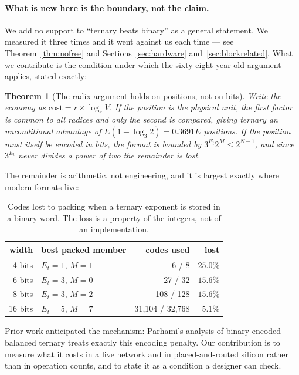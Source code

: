 \documentclass[11pt]{article}
\newtheorem{theorem}{Theorem}
\theoremstyle{definition}
\begin{document}
\paragraph{What is new here is the boundary, not the claim.} We add no support to
``ternary beats binary'' as a general statement. We measured it three times and it
went against us each time --- see Theorem~\ref{thm:nofree} and
Sections~\ref{sec:hardware} and~\ref{sec:blockrelated}. What we contribute is the
condition under which the sixty-eight-year-old argument applies, stated exactly:

\begin{theorem}[The radix argument holds on positions, not on bits]
\label{thm:boundary}
Write the economy as $\text{cost} = r \times \log_r V$. If the position is the
physical unit, the first factor is common to all radices and only the second is
compared, giving ternary an unconditional advantage of $E(1-\log_3 2) = 0.3691E$
positions. If the position must itself be encoded in bits, the format is bounded
by $3^{E_t} 2^{M} \le 2^{N-1}$, and since $3^{E_t}$ never divides a power of two
the remainder is lost.
\end{theorem}

The remainder is arithmetic, not engineering, and it is largest exactly where
modern formats live:

\begin{table}[t]\centering
\caption{Codes lost to packing when a ternary exponent is stored in a binary
word. The loss is a property of the integers, not of an implementation.}
\label{tab:packloss}
\begin{tabular}{rlrr}
\toprule
width & best packed member & codes used & lost \\
\midrule
4 bits & $E_t{=}1$, $M{=}1$ & 6 / 8 & $25.0\%$ \\
6 bits & $E_t{=}3$, $M{=}0$ & 27 / 32 & $15.6\%$ \\
8 bits & $E_t{=}3$, $M{=}2$ & 108 / 128 & $15.6\%$ \\
16 bits & $E_t{=}5$, $M{=}7$ & 31{,}104 / 32{,}768 & $5.1\%$ \\
\bottomrule
\end{tabular}
\end{table}

Prior work anticipated the mechanism: Parhami's analysis of binary-encoded
balanced ternary treats exactly this encoding penalty. Our contribution is to
measure what it costs in a live network and in placed-and-routed silicon rather
than in operation counts, and to state it as a condition a designer can check.
\end{document}
